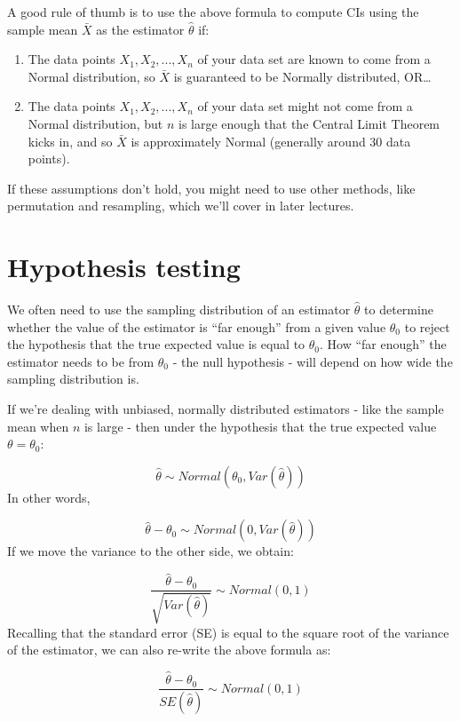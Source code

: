 \documentclass[
]{book}
\begin{document}
A good rule of thumb is to use the above formula to compute CIs using the sample mean \(\bar{X}\) as the estimator \(\hat{\theta}\) if:

\begin{enumerate}
\def\labelenumi{\arabic{enumi}.}
\item
  The data points \(X_1, X_2, ..., X_n\) of your data set are known to come from a Normal distribution, so \(\bar{X}\) is guaranteed to be Normally distributed, OR\ldots{}
\item
  The data points \(X_1, X_2, ..., X_n\) of your data set might not come from a Normal distribution, but \(n\) is large enough that the Central Limit Theorem kicks in, and so \(\bar{X}\) is approximately Normal (generally around 30 data points).
\end{enumerate}

If these assumptions don't hold, you might need to use other methods, like permutation and resampling, which we'll cover in later lectures.

\hypertarget{hypothesis-testing}{%
\section{Hypothesis testing}\label{hypothesis-testing}}

We often need to use the sampling distribution of an estimator \(\hat{\theta}\) to determine whether the value of the estimator is ``far enough'' from a given value \(\theta_0\) to reject the hypothesis that the true expected value is equal to \(\theta_0\). How ``far enough'' the estimator needs to be from \(\theta_0\) - the null hypothesis - will depend on how wide the sampling distribution is.

If we're dealing with unbiased, normally distributed estimators - like the sample mean when \(n\) is large - then under the hypothesis that the true expected value \(\theta = \theta_0\):

\[\hat{\theta} \sim Normal(\theta_0, Var(\hat{\theta}))\]
In other words,

\[\hat{\theta} - \theta_0 \sim Normal(0, Var(\hat{\theta}))\]
If we move the variance to the other side, we obtain:

\[\frac{\hat{\theta} - \theta_0}{\sqrt{Var(\hat{\theta})}} \sim Normal(0, 1)\]
Recalling that the standard error (SE) is equal to the square root of the variance of the estimator, we can also re-write the above formula as:

\[\frac{\hat{\theta} - \theta_0}{SE(\hat{\theta})} \sim Normal(0, 1)\]
\end{document}
